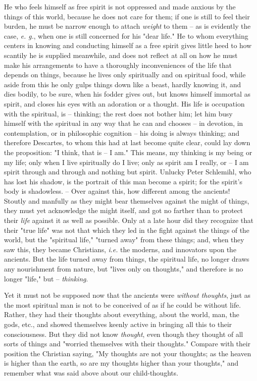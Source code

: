 \documentclass[a4paper]{book}
\begin{document}
He who feels himself as free spirit is not oppressed and made anxious by the 
things of this world, because he does not care for them; if one is still to 
feel their burden, he must be narrow enough to attach \textit{weight} to them 
-- as is evidently the case, \textit{e. g.}, when one is still concerned for 
his "{}dear life."{} He to whom everything centers in knowing and conducting 
himself as a free spirit gives little heed to how scantily he is supplied 
meanwhile, and does not reflect at all on how he must make his arrangements to 
have a thoroughly inconveniences of the life that depends on things, because 
he lives only spiritually and on spiritual food, while aside from this he only 
gulps things down like a beast, hardly knowing it, and dies bodily, to be 
sure, when his fodder gives out, but knows himself immortal as spirit, and 
closes his eyes with an adoration or a thought. His life is occupation with 
the spiritual, is -- thinking; the rest does not bother him; let him busy 
himself with the spiritual in any way that he can and chooses -- in devotion, 
in contemplation, or in philosophic cognition -- his doing is always thinking; 
and therefore Descartes, to whom this had at last become quite clear, could 
lay down the proposition: "{}I think, that is -- I am."{} This means, my 
thinking is my being or my life; only when I live spiritually do I live; only 
as spirit am I really, or -- I am spirit through and through and nothing but 
spirit. Unlucky Peter Schlemihl, who has lost his shadow, is the portrait of 
this man become a spirit; for the spirit's body is shadowless. -- Over against 
this, how different among the ancients! Stoutly and manfully as they might 
bear themselves against the might of things, they must yet acknowledge the 
might itself, and got no farther than to protect their \textit{life} against 
it as well as possible. Only at a late hour did they recognize that their 
"{}true life"{} was not that which they led in the fight against the things of 
the world, but the "{}spiritual life,"{} "{}turned away"{} from these things; 
and, when they saw this, they became Christians, \textit{i.e.} the moderns, 
and innovators upon the ancients. But the life turned away from things, the 
spiritual life, no longer draws any nourishment from nature, but "{}lives only 
on thoughts,"{} and therefore is no longer "{}life,"{} but -- 
\textit{thinking}.

Yet it must not be supposed now that the ancients were \textit{without 
thoughts}, just as the most spiritual man is not to be conceived of as if he 
could be without life. Rather, they had their thoughts about everything, about 
the world, man, the gods, etc., and showed themselves keenly active in 
bringing all this to their consciousness. But they did not know 
\textit{thought}, even though they thought of all sorts of things and 
"{}worried themselves with their thoughts."{} Compare with their position the 
Christian saying, "{}My thoughts are not your thoughts; as the heaven is 
higher than the earth, so are my thoughts higher than your thoughts,"{} and 
remember what was said above about our child-thoughts.
\end{document}
